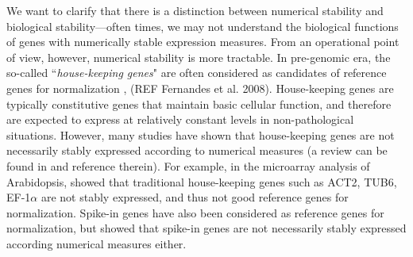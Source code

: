\documentclass[letterpaper,12pt]{article}
\begin{document}
We want to clarify that there is a distinction between
numerical stability and biological stability---often times, we may not
understand the biological functions of genes with numerically stable
expression measures.  From an operational point of view, however, numerical
stability is more tractable. In pre-genomic era, the so-called ``\textit{house-keeping
genes}" are often considered as candidates of reference genes for
normalization \citep{bustin2002quantification, andersen2004normalization},
(REF Fernandes et al.  2008). House-keeping
genes are typically constitutive genes that
maintain basic cellular function, and therefore are expected to express at
relatively constant levels in non-pathological situations.  However, many
studies have shown that house-keeping
genes are not necessarily stably expressed according to
numerical measures (a review can be found in \cite{huggett2005real} and
reference therein).  For example, in the microarray analysis of Arabidopsis, \cite{czechowski2005genome}
showed that traditional house-keeping
genes such as ACT2, TUB6, EF-1$\alpha$ are not stably
expressed, and thus not good reference genes for normalization.  Spike-in
genes  have also been considered as reference genes for normalization, but %
\cite{risso2014nat} showed that spike-in genes are not necessarily stably
expressed according numerical measures either.  
\end{document}
